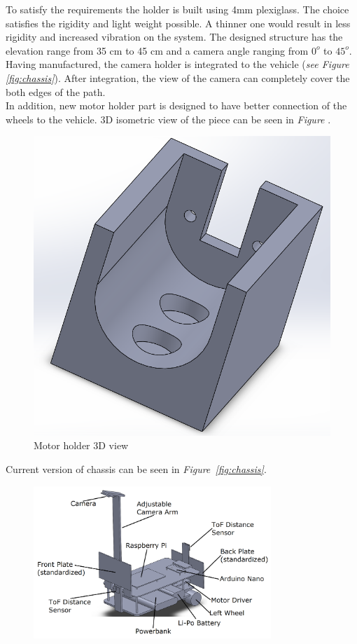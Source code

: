 \documentclass[a4paper,12pt]{article}
\begin{document}
\begin{enumerate}[A.]
To satisfy the requirements the holder is built using 4mm plexiglass. The choice satisfies the rigidity and light weight possible. A thinner one would result in less rigidity and increased vibration on the system. The designed structure has the elevation range from 35 cm to 45 cm and a camera angle ranging from $0^o$ to $45^o$. Having manufactured, the camera holder is integrated to the vehicle (\textit{see Figure \ref{fig:chassis}}). After integration, the view of the camera can completely cover the both edges of the path.\\

In addition, new motor holder part is designed to have better connection of the wheels to the vehicle. 3D isometric view of the piece can be seen in \textit{Figure }.
\begin{figure}[h]
	\includegraphics[width=.2\textheight,center]{images/motor-holder.png}
	\caption{Motor holder 3D view}
\end{figure}



Current version of chassis can be seen in \textit{Figure~\ref{fig:chassis}}.



\begin{figure}[h]

\includegraphics[width=0.8\textwidth,center]{images/chassis1}


\end{figure}
\end{enumerate}
\end{document}
